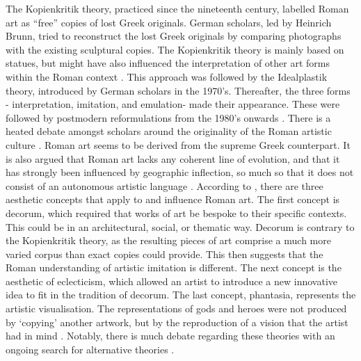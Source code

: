 	The Kopienkritik theory, practiced since the nineteenth century, labelled Roman art as “free” copies of lost Greek originals. German scholars, led by Heinrich Brunn, tried to reconstruct the lost Greek originals by comparing photographs with the existing sculptural copies. The Kopienkritik theory is mainly based on statues, but might have also influenced the interpretation of other art forms within the Roman context \parencites{Perry_2005}[4--6]{Gazda_2002}. This approach was followed by the Idealplastik theory, introduced by German scholars in the 1970’s. Thereafter, the three forms - interpretation, imitation, and emulation- made their appearance. These were followed by postmodern reformulations from the 1980’s onwards \parencite[7--9]{Gazda_2002} . 
	There is a heated debate amongst scholars around the originality of the Roman artistic culture \parencite {LaRocca_2010}. Roman art seems to be derived from the supreme Greek counterpart. It is also argued that Roman art lacks any coherent line of evolution, and that it has strongly been influenced by geographic inflection, so much so that it does not consist of an autonomous artistic language \parencite [344--345] {LaRocca_2010}. 
	According to \textcite{Perry_2005}, there are three aesthetic concepts that apply to and influence Roman art. The first concept is decorum, which required that works of art be bespoke to their specific contexts. This could be in an architectural, social, or thematic way. Decorum is contrary to the Kopienkritik theory, as the resulting pieces of art comprise a much more varied corpus than exact copies could provide. This then suggests that the Roman understanding of artistic imitation is different. The next concept is the aesthetic of eclecticism, which allowed an artist to introduce a new innovative idea to fit in the tradition of decorum. The last concept, phantasia, represents the artistic visualisation. The representations of gods and heroes were not produced by ‘copying’ another artwork, but by the reproduction of a vision that the artist had in mind \parencite {Perry_2005}. Notably, there is much debate regarding these theories with an ongoing search for alternative theories \parencite [16]{Gazda_2002}. 
	

